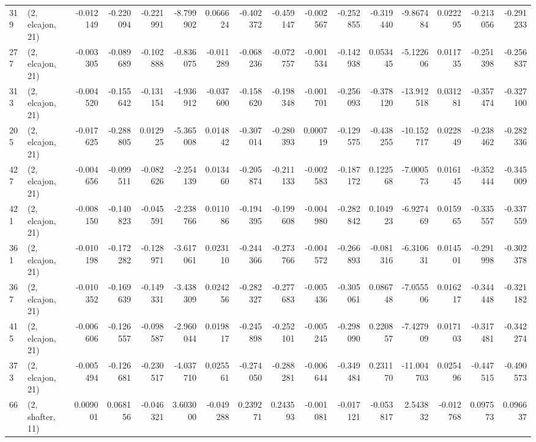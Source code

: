 \begin{tabular}{llrrrrrrrrrrrrrr}
319 &  (2, elcajon, 21) &  -0.012149 & -0.220094 & -0.221991 &  -8.799902 &  0.066624 &  -0.402372 & -0.459147 & -0.002567 & -0.252855 & -0.319440 &    -9.867484 &   0.022295 &  -0.213056 &  -0.291233 \\
277 &  (2, elcajon, 21) &  -0.003305 & -0.089689 & -0.102888 &  -0.836075 & -0.011289 &  -0.068236 & -0.072757 & -0.001534 & -0.142938 &  0.053445 &    -5.122606 &   0.011735 &  -0.251398 &  -0.256837 \\
313 &  (2, elcajon, 21) &  -0.004520 & -0.155642 & -0.131154 &  -4.936912 & -0.037600 &  -0.158620 & -0.198348 & -0.001701 & -0.256093 & -0.378120 &   -13.912518 &   0.031281 &  -0.357474 &  -0.327100 \\
205 &  (2, elcajon, 21) &  -0.017625 & -0.288805 &  0.012925 &  -5.365008 &  0.014842 &  -0.307014 & -0.280393 &  0.000719 & -0.129575 & -0.438255 &   -10.152717 &   0.022849 &  -0.238462 &  -0.282336 \\
427 &  (2, elcajon, 21) &  -0.004656 & -0.099511 & -0.082626 &  -2.254139 &  0.013460 &  -0.205874 & -0.211133 & -0.002583 & -0.187172 &  0.122568 &    -7.000573 &   0.016145 &  -0.352444 &  -0.345009 \\
421 &  (2, elcajon, 21) &  -0.008150 & -0.140823 & -0.045591 &  -2.238766 &  0.011086 &  -0.194395 & -0.199608 & -0.004980 & -0.282842 &  0.104923 &    -6.927469 &   0.015965 &  -0.335557 &  -0.337559 \\
361 &  (2, elcajon, 21) &  -0.010198 & -0.172282 & -0.128971 &  -3.617061 &  0.023110 &  -0.244366 & -0.273766 & -0.004572 & -0.266893 & -0.081316 &    -6.310631 &   0.014501 &  -0.291998 &  -0.302378 \\
367 &  (2, elcajon, 21) &  -0.010352 & -0.169639 & -0.149331 &  -3.438309 &  0.024256 &  -0.282327 & -0.277683 & -0.005436 & -0.305061 &  0.086748 &    -7.055506 &   0.016217 &  -0.344448 &  -0.321182 \\
415 &  (2, elcajon, 21) &  -0.006606 & -0.126557 & -0.098587 &  -2.960044 &  0.019817 &  -0.245898 & -0.252101 & -0.005245 & -0.298090 &  0.220857 &    -7.427909 &   0.017103 &  -0.317481 &  -0.342274 \\
373 &  (2, elcajon, 21) &  -0.005494 & -0.126681 & -0.230517 &  -4.037710 &  0.025561 &  -0.274050 & -0.288281 & -0.006644 & -0.349484 &  0.231170 &   -11.004703 &   0.025496 &  -0.447515 &  -0.490573 \\
66  &  (2, shafter, 11) &   0.009001 &  0.068156 & -0.046321 &   3.603000 & -0.049288 &   0.239271 &  0.243593 & -0.001081 & -0.017121 & -0.053817 &     2.543832 &  -0.012768 &   0.097573 &   0.096637 \\

\end{tabular}
